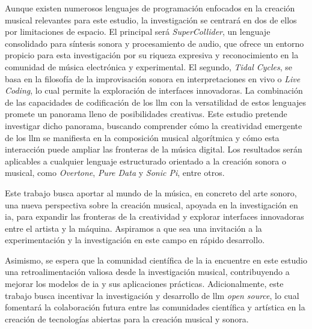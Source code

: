 Aunque existen numerosos lenguajes de programación enfocados en la creación musical relevantes para este estudio, la investigación se centrará en dos de ellos por limitaciones de espacio. El principal será \emph{SuperCollider}, un lenguaje consolidado para síntesis sonora y procesamiento de audio, que ofrece un entorno propicio para esta investigación por su riqueza expresiva y reconocimiento en la comunidad de música electrónica y experimental. El segundo, \emph{Tidal Cycles}, se basa en la filosofía de la improvisación sonora en interpretaciones en vivo o \emph{Live Coding}, lo cual permite la exploración de interfaces innovadoras. La combinación de las capacidades de codificación de los \gls{llm} con la versatilidad de estos lenguajes promete un panorama lleno de posibilidades creativas. Este estudio pretende investigar dicho panorama, buscando comprender cómo la creatividad emergente de los \gls{llm} se manifiesta en la composición musical algorítmica y cómo esta interacción puede ampliar las fronteras de la música digital. Los resultados serán aplicables a cualquier lenguaje estructurado orientado a la creación sonora o musical, como \emph{Overtone}, \emph{Pure Data} y \emph{Sonic Pi}, entre otros.

Este trabajo busca aportar al mundo de la música, en concreto del arte sonoro, una nueva perspectiva sobre la creación musical, apoyada en la investigación en \gls{ia}, para expandir las fronteras de la creatividad y explorar interfaces innovadoras entre el artista y la máquina. Aspiramos a que sea una invitación a la experimentación y la investigación en este campo en rápido desarrollo.

Asimismo, se espera que la comunidad científica de la \gls{ia} encuentre en este estudio una retroalimentación valiosa desde la investigación musical, contribuyendo a mejorar los modelos de \gls{ia} y sus aplicaciones prácticas. Adicionalmente, este trabajo busca incentivar la investigación y desarrollo de \gls{llm} \emph{open source}, lo cual fomentará la colaboración futura entre las comunidades científica y artística en la creación de tecnologías abiertas para la creación musical y sonora.